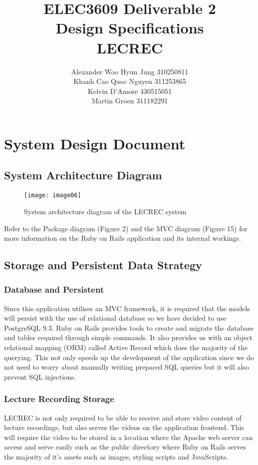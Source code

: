 \documentclass{article}
\title{ELEC3609 Deliverable 2 \\ Design Specifications \\[1cm] {\Huge{LECREC}}}
\author{Alexander Woo Hyun Jung  310250811 \\ Khanh Cao Quoc Nguyen 311253865 \\ Kelvin D'Amore 430515051 \\ Martin Groen 311182291}
\date{}
\begin{document}
\maketitle
\thispagestyle{empty}

\newpage
\tableofcontents
\newpage

\section{System Design Document}
\subsection{System Architecture Diagram}
\begin{figure}[h!]
\centering
\texttt{[image: image06]}
\caption{System architecture diagram of the LECREC system}
\end{figure}
Refer to the Package diagram (Figure 2) and the MVC diagram (Figure 15) for more information on the Ruby on Rails application and its internal workings.

\subsection{Storage and Persistent Data Strategy}
\subsubsection{Database and Persistent}
Since this application utilises an MVC framework, it is required that the models will persist with the use of relational database so we have decided to use PostgreSQL 9.3. Ruby on Rails provides tools to create and migrate the database and tables required through simple commands. It also provides us with an object relational mapping (ORM) called Active Record which does the majority of the querying. This not only speeds up the development of the application since we do not need to worry about manually writing prepared SQL queries but it will also prevent SQL injections.

\subsubsection{Lecture Recording Storage}
LECREC is not only required to be able to receive and store video content of lecture recordings, but also serves the videos on the application frontend. This will require the video to be stored in a location where the Apache web server can access and serve easily such as the public directory where Ruby on Rails serves the majority of it's assets such as images, styling scripts and JavaScripts. 
\end{document}
